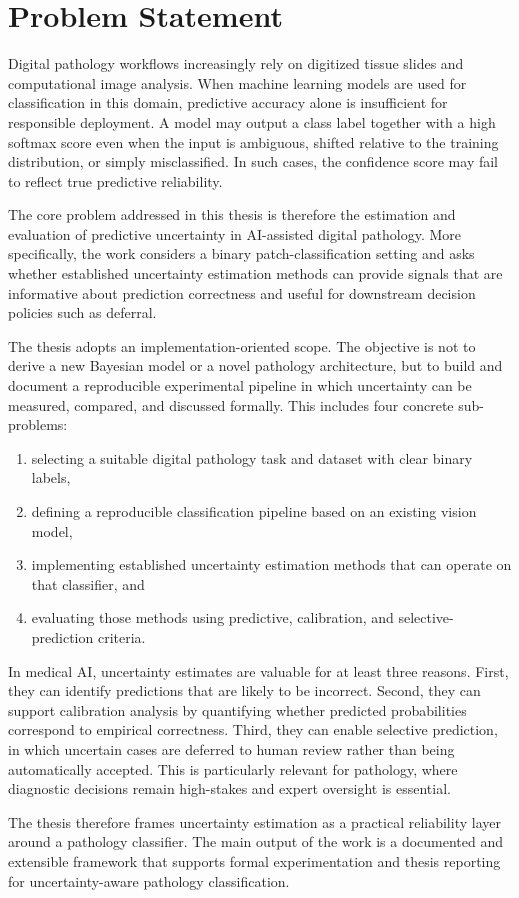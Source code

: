 \chapter{Problem Statement}
\label{chap:problem_statement}

Digital pathology workflows increasingly rely on digitized tissue slides and computational image analysis. When machine learning models are used for classification in this domain, predictive accuracy alone is insufficient for responsible deployment. A model may output a class label together with a high softmax score even when the input is ambiguous, shifted relative to the training distribution, or simply misclassified. In such cases, the confidence score may fail to reflect true predictive reliability.

The core problem addressed in this thesis is therefore the estimation and evaluation of predictive uncertainty in AI-assisted digital pathology. More specifically, the work considers a binary patch-classification setting and asks whether established uncertainty estimation methods can provide signals that are informative about prediction correctness and useful for downstream decision policies such as deferral.

The thesis adopts an implementation-oriented scope. The objective is not to derive a new Bayesian model or a novel pathology architecture, but to build and document a reproducible experimental pipeline in which uncertainty can be measured, compared, and discussed formally. This includes four concrete sub-problems:

\begin{enumerate}
    \item selecting a suitable digital pathology task and dataset with clear binary labels,
    \item defining a reproducible classification pipeline based on an existing vision model,
    \item implementing established uncertainty estimation methods that can operate on that classifier, and
    \item evaluating those methods using predictive, calibration, and selective-prediction criteria.
\end{enumerate}

In medical AI, uncertainty estimates are valuable for at least three reasons. First, they can identify predictions that are likely to be incorrect. Second, they can support calibration analysis by quantifying whether predicted probabilities correspond to empirical correctness. Third, they can enable selective prediction, in which uncertain cases are deferred to human review rather than being automatically accepted. This is particularly relevant for pathology, where diagnostic decisions remain high-stakes and expert oversight is essential.

The thesis therefore frames uncertainty estimation as a practical reliability layer around a pathology classifier. The main output of the work is a documented and extensible framework that supports formal experimentation and thesis reporting for uncertainty-aware pathology classification.

